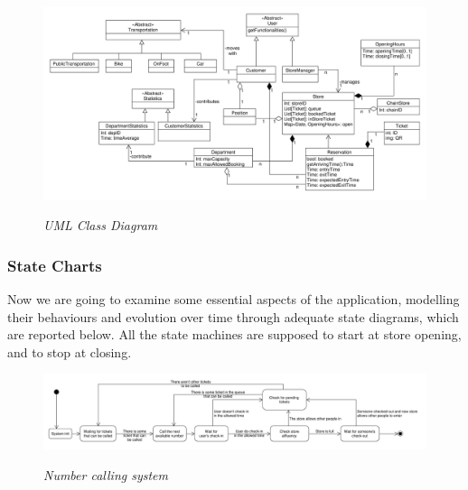 \documentclass{article}
\begin{document}
			\begin{figure}
			\begin{adjustwidth}{-3cm}{}
				\centering
				\includegraphics[scale=0.45, angle=90, trim= 0 0 0 -5cm]{ClassDiagrams/classDiagram.pdf} \\
				\caption{\emph{UML Class Diagram}}
			\end{adjustwidth}
		\end{figure}
	
		\newpage
		
		\subsubsection{State Charts}
		
		Now we are going to examine some essential aspects of the application, modelling their behaviours and evolution over time through adequate state diagrams, which are reported below. All the state machines are supposed to start at store opening, and to stop at closing.
		
		\begin{figure}[!h]
			\centering
			\hspace*{-2.57cm}\includegraphics[scale=0.32]{StateCharts/number_calling_system.pdf} \\
			\caption{\emph{Number calling system}}
		\end{figure}
	
\end{document}
